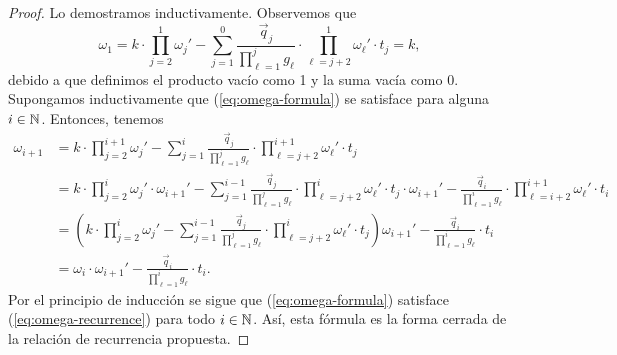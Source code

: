 \begin{proof}
	Lo demostramos inductivamente. Observemos que
	\begin{equation*}
		\omega_1 =
		k \cdot \prod_{j=2}^{1} \omega_j'
		- \sum_{j=1}^{0}\frac{\vec{q}_j}{\prod_{\ell=1}^{j}g_\ell}
		\cdot \prod_{\ell=j+2}^{1}\omega_\ell' \cdot t_j
		= k,
	\end{equation*}
	debido a que definimos el producto vacío como 1 y la suma vacía como 0. Supongamos
	inductivamente que (\ref{eq:omega-formula}) se satisface para alguna $i \in \mathbb{N}$. Entonces,
	tenemos
	\begin{align*}
		\omega_{i + 1}
		&=
		k \cdot \prod_{j=2}^{i + 1} \omega_j'
		- \sum_{j=1}^{i}\frac{\vec{q}_j}{\prod_{\ell=1}^{j}g_\ell}
		\cdot \prod_{\ell=j+2}^{i + 1}\omega_\ell' \cdot t_j \\
		&=
		k \cdot \prod_{j=2}^{i} \omega_j' \cdot \omega_{i+1}'
		- \sum_{j=1}^{i - 1}\frac{\vec{q}_j}{\prod_{\ell=1}^{j}g_\ell}
		\cdot \prod_{\ell=j+2}^{i}\omega_\ell' \cdot t_j \cdot \omega_{i + 1}'
		- \frac{\vec{q}_i}{\prod_{\ell = 1}^{i}g_\ell}
		\cdot \prod_{\ell = i + 2}^{i + 1}\omega_\ell' \cdot t_i \\
		&= 
		\left( k \cdot \prod_{j=2}^{i} \omega_j'
		- \sum_{j=1}^{i - 1}\frac{\vec{q}_j}{\prod_{\ell=1}^{j}g_\ell}
		\cdot \prod_{\ell=j+2}^{i}\omega_\ell' \cdot t_j \right) \omega_{i+1}'
		- \frac{\vec{q}_i}{\prod_{\ell = 1}^{i}g_\ell} \cdot t_i  \\
		&= \omega_i \cdot \omega_{i + 1}' - \frac{\vec{q}_i}{\prod_{\ell = 1}^{i}g_\ell} \cdot t_i.
	\end{align*}
	Por el principio de inducción se sigue que (\ref{eq:omega-formula}) satisface
	(\ref{eq:omega-recurrence}) para todo $i \in \mathbb{N}$. Así, esta fórmula es la forma cerrada de la
	relación de recurrencia propuesta.
\end{proof}

